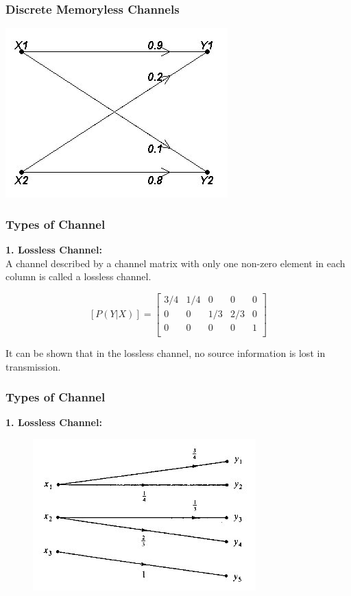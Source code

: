 \documentclass[a4]{beamer}
\begin{document}
\begin{frame}
\frametitle{Discrete Memoryless Channels}

\begin{center}
\includegraphics[scale=0.54]{images/10Bnet2}
\end{center}
\end{frame}
\begin{frame}
\frametitle{Types of Channel}
\textbf{ 1. Lossless Channel:}\\
A channel described by a channel matrix with only one non-zero element in each column is called a lossless channel.


\[  [P(Y|X)]  =  \left[ \begin{array}{ccccc}
3/4 & 1/4 &0 & 0&0\\
0  & 0 &1/3 & 2/3& 0\\
0  & 0& 0&0 &1 \\
\end{array} \right]  \]

It can be shown that in the lossless channel, no source information is lost in transmission.
\end{frame}
\begin{frame}
\frametitle{Types of Channel}
\textbf{ 1. Lossless Channel:}\\

\begin{figure}
\centering
\includegraphics[width=0.7\linewidth]{images/11Blossless}
\caption{}
\label{fig:11Blossless}
\end{figure}


\end{frame}
\end{document}
